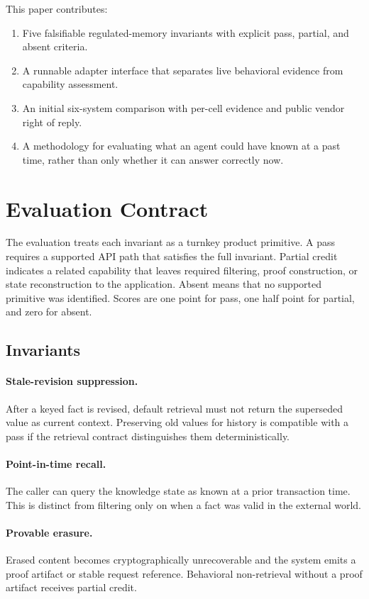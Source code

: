 \documentclass[11pt]{article}
\begin{document}
This paper contributes:
\begin{enumerate}
  \item Five falsifiable regulated-memory invariants with explicit pass, partial, and absent criteria.
  \item A runnable adapter interface that separates live behavioral evidence from capability assessment.
  \item An initial six-system comparison with per-cell evidence and public vendor right of reply.
  \item A methodology for evaluating what an agent could have known at a past time, rather than only whether it can answer correctly now.
\end{enumerate}

\section{Evaluation Contract}
The evaluation treats each invariant as a turnkey product primitive. A pass requires a supported API path that satisfies the full invariant. Partial credit indicates a related capability that leaves required filtering, proof construction, or state reconstruction to the application. Absent means that no supported primitive was identified. Scores are one point for pass, one half point for partial, and zero for absent.

\subsection{Invariants}
\paragraph{Stale-revision suppression.} After a keyed fact is revised, default retrieval must not return the superseded value as current context. Preserving old values for history is compatible with a pass if the retrieval contract distinguishes them deterministically.

\paragraph{Point-in-time recall.} The caller can query the knowledge state as known at a prior transaction time. This is distinct from filtering only on when a fact was valid in the external world.

\paragraph{Provable erasure.} Erased content becomes cryptographically unrecoverable and the system emits a proof artifact or stable request reference. Behavioral non-retrieval without a proof artifact receives partial credit.
\end{document}

